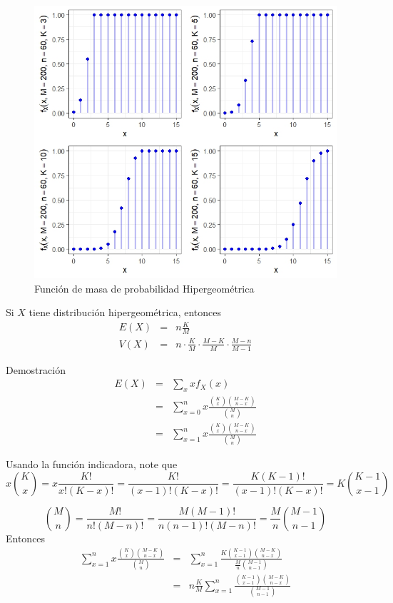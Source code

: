 \begin{i}
\begin{figure}[h!]
\centering
\includegraphics[scale=1]{Figuras/Hipergeometrica.jpeg}
\caption{Función de masa de probabilidad Hipergeométrica}
\end{figure}

\begin{theorem}
Si $X$ tiene distribución hipergeométrica, entonces
\begin{eqnarray*}
E(X) &=&n\frac{K}{M} \\
V(X) &=&n\cdot \frac{K}{M}\cdot \frac{M-K}{M}\cdot \frac{M-n}{M-1}
\end{eqnarray*}
\end{theorem}

Demostración
\begin{eqnarray*}
E(X) &=&\sum_{x}xf_{X}(x) \\
&=&\sum_{x=0}^{n}x\frac{\binom{K}{x}\binom{M-K}{n-x}}{\binom{M}{n}} \\
&=&\sum_{x=1}^{n}x\frac{\binom{K}{x}\binom{M-K}{n-x}}{\binom{M}{n}}
\end{eqnarray*}

Usando la función indicadora, note que 
\begin{equation*}
x\binom{K}{x}=x\frac{K!}{x!(K-x)!}=\frac{K!}{\left( x-1\right) !(K-x)!}=%
\frac{K(K-1)!}{\left( x-1\right) !(K-x)!}=K\binom{K-1}{x-1}
\end{equation*}

\begin{equation*}
\binom{M}{n}=\frac{M!}{n!(M-n)!}=\frac{M(M-1)!}{n(n-1)!(M-n)!}=\frac{M}{n}
\binom{M-1}{n-1}
\end{equation*}
Entonces
\begin{eqnarray*}
\sum_{x=1}^{n}x\frac{\binom{K}{x}\binom{M-K}{n-x}}{\binom{M}{n}}
&=&\sum_{x=1}^{n}\frac{K\binom{K-1}{x-1}\binom{M-K}{n-x}}{\frac{M}{n}\binom{
M-1}{n-1}} \\
&=&n\frac{K}{M}\sum_{x=1}^{n}\frac{\binom{K-1}{x-1}\binom{M-K}{n-x}}{\binom{
M-1}{n-1}}
\end{eqnarray*}


\end{i}
